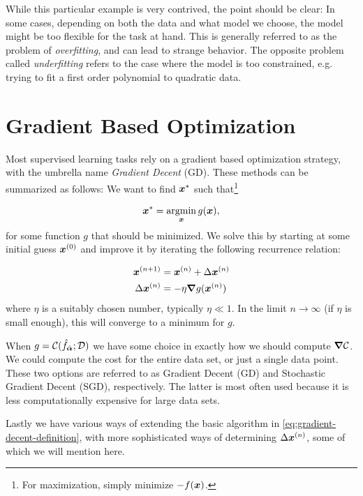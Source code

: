 \documentclass[Thesis.tex]{subfiles}
\begin{document}
While this particular example is very contrived, the point should be clear: In
some cases, depending on both the data and what model we choose, the model might
be too flexible for the task at hand. This is generally referred to as the
problem of \emph{overfitting}, and can lead to strange behavior. The opposite
problem called \emph{underfitting} refers to the case where the model is too
constrained, e.g. trying to fit a first order polynomial to
quadratic data.

\section{Gradient Based Optimization}
\label{sec:ml-optimization}

Most supervised learning tasks rely on a gradient based optimization strategy,
with the umbrella name \emph{Gradient Decent} (GD).
These methods can be summarized as follows: We want to find $\bm{x}^*$ such that\footnote{For maximization, simply minimize $-f(\bm{x})$. }

\begin{align}
  \bm{x}^* = \operatorname*{argmin}_{\bm{x}} g(\bm{x}),
\end{align}
for some function $g$ that should be minimized.
We solve this by starting at some initial guess $\bm{x}^{(0)}$ and improve it by
iterating the following recurrence relation:

\begin{align}
  \label{eq:gradient-decent-definition}
  \bm{x}^{(n+1)} &= \bm{x}^{(n)} + \Delta \bm{x}^{(n)} \\
  \Delta\bm{x}^{(n)} &= -\eta \grad{g}(\bm{x}^{(n)})
\end{align}
where $\eta$ is a suitably chosen number, typically $\eta \ll 1$. In the
limit $n\to\infty$ (if $\eta$ is small enough), this will converge to a minimum
for $g$.

When $g=\mathcal{C}(\hat f_{\hat{\bm{\alpha}}}; \mathcal{D})$ we have some choice in
exactly how we should compute $\grad{\mathcal{C}}$. We could compute the cost
for the entire data set, or just a single data point. These
two options are referred to as Gradient Decent (GD) and Stochastic Gradient
Decent (SGD), respectively. The latter is most often used because it is less
computationally expensive for large data sets.

Lastly we have various ways of extending the basic algorithm in
\cref{eq:gradient-decent-definition}, with more sophisticated ways of
determining $\Delta \bm{x}^{(n)}$, some of which we will mention here.
\end{document}

